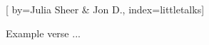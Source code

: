 
[%
    by={Julia Sheer & Jon D.},
    index={littletalks}]


    \label{littletalks}

    \beginverse
        Example verse ...
    \endverse
\endsong
